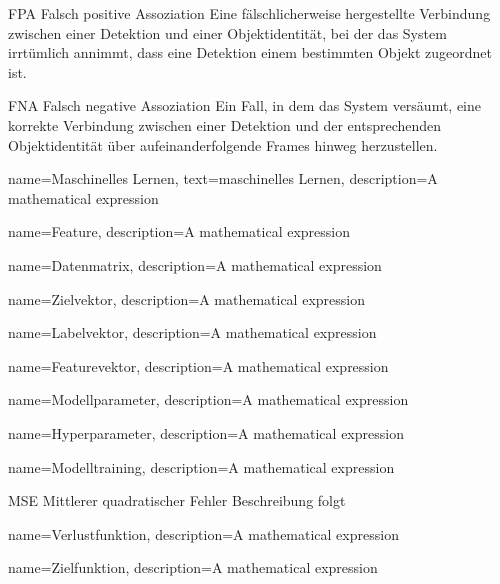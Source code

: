 \newglossaryentrywithacronym
{FPA}
{Falsch positive Assoziation}
{Eine fälschlicherweise hergestellte Verbindung zwischen einer Detektion und einer Objektidentität, bei der das System irrtümlich annimmt, dass eine Detektion einem bestimmten Objekt zugeordnet ist.}

\newglossaryentrywithacronym
{FNA}
{Falsch negative Assoziation}
{Ein Fall, in dem das System versäumt, eine korrekte Verbindung zwischen einer Detektion und der entsprechenden Objektidentität über aufeinanderfolgende Frames hinweg herzustellen.}


{
        name=Maschinelles Lernen,
        text=maschinelles Lernen,
        description={A mathematical expression}
}

{
        name=Feature,
        description={A mathematical expression}
}

{
        name=Datenmatrix,
        description={A mathematical expression}
}

{
        name=Zielvektor,
        description={A mathematical expression}
}

{
        name=Labelvektor,
        description={A mathematical expression}
}

{
        name=Featurevektor,
        description={A mathematical expression}
}

{
        name=Modellparameter,
        description={A mathematical expression}
}

{
        name=Hyperparameter,
        description={A mathematical expression}
}

{
        name=Modelltraining,
        description={A mathematical expression}
}

\newglossaryentrywithacronym
{MSE}
{Mittlerer quadratischer Fehler}
{Beschreibung folgt}

{
        name=Verlustfunktion,
        description={A mathematical expression}
}

{
        name=Zielfunktion,
        description={A mathematical expression}
}

